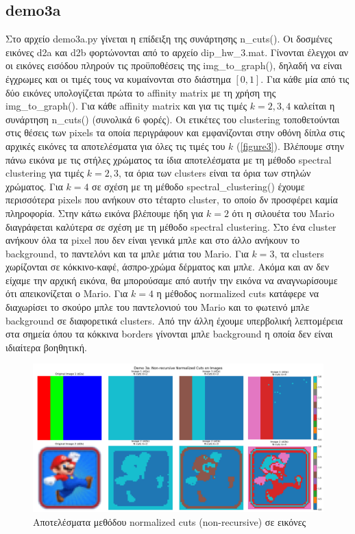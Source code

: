 \documentclass{article}
\begin{document}
\subsection{demo3a} 
Στο αρχείο demo3a.py γίνεται η επίδειξη της συνάρτησης n\_cuts(). Οι
δοσμένες εικόνες d2a και d2b φορτώνονται από το αρχείο 
dip\_hw\_3.mat. Γίνονται έλεγχοι αν οι εικόνες εισόδου πληρούν τις προϋποθέσεις 
της img\_to\_graph(), δηλαδή να είναι έγχρωμες και οι τιμές τους να κυμαίνονται 
στο διάστημα $[0,1]$. Για κάθε μία από τις δύο εικόνες υπολογίζεται πρώτα το
affinity matrix με τη χρήση της img\_to\_graph(). Για κάθε affinity matrix και 
για τις τιμές $k=2,3,4$ καλείται η συνάρτηση n\_cuts() (συνολικά 6 φορές).
Οι ετικέτες του clustering τοποθετούνται στις θέσεις των pixels τα οποία περιγράφουν
και εμφανίζονται στην οθόνη δίπλα στις αρχικές εικόνες τα αποτελέσματα για όλες 
τις τιμές του $k$ (\autoref{figure3}). Βλέπουμε στην πάνω εικόνα με τις στήλες χρώματος
τα ίδια αποτελέσματα με τη μέθοδο spectral clustering για τιμές $k=2,3$, τα όρια 
των clusters είναι τα όρια των στηλών χρώματος. Για $k=4$ σε σχέση με τη μέθοδο 
spectral\_clustering() έχουμε περισσότερα
pixels που ανήκουν στο τέταρτο cluster, το οποίο δν προσφέρει καμία πληροφορία.
Στην κάτω εικόνα βλέπουμε ήδη για $k=2$ ότι η σιλουέτα του Mario διαγράφεται 
καλύτερα σε σχέση με τη μέθοδο spectral clustering. Στο ένα cluster ανήκουν 
όλα τα pixel που δεν είναι γενικά μπλε και στο
άλλο ανήκουν το background, το παντελόνι και τα μπλε μάτια του Mario. Για $k=3$,
τα clusters χωρίζονται σε κόκκινο-καφέ, άσπρο-χρώμα δέρματος και μπλε. Ακόμα και
αν δεν είχαμε την αρχική εικόνα, θα μπορούσαμε από αυτήν την εικόνα να αναγνωρίσουμε
ότι απεικονίζεται ο Mario. Για $k=4$ η μέθοδος normalized cuts κατάφερε να διαχωρίσει
το σκούρο μπλε του παντελονιού του Mario και το φωτεινό μπλε background σε 
διαφορετικά clusters. Από την άλλη έχουμε υπερβολική λεπτομέρεια στα σημεία όπου 
τα κόκκινα borders γίνονται μπλε background η οποία δεν είναι ιδιαίτερα βοηθητική.

\begin{figure}
    \centering
    \includegraphics[width=\linewidth]{Figure_3.png}
    \caption{Αποτελέσματα μεθόδου normalized cuts (non-recursive) σε εικόνες}\label{figure3}
\end{figure}
\end{document}
